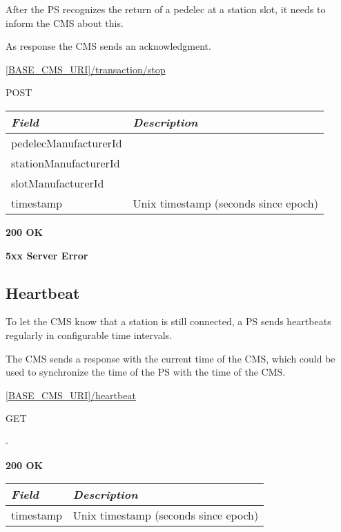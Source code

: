 After the \acs{PS} recognizes the return of a pedelec at a station slot, it needs to inform the \acs{CMS} about this.

As response the \acs{CMS} sends an acknowledgment.

 \url{[BASE_CMS_URI]/transaction/stop}

 POST

\begin{table}[!h]
\vspace{-7mm}
\begin{tabularx}{\linewidth}{ | l | X | }
  \hline
  \textit{Field} & \textit{Description} \\
  \hline \hline
  	pedelecManufacturerId			& \\
  	stationManufacturerId			& \\
  	slotManufacturerId			& \\
  	timestamp					& Unix timestamp (seconds since epoch) \\
  	
    \hline
\end{tabularx}
\end{table}

 \textbf{200 OK}

 \textbf{5xx Server Error}

\subsection{Heartbeat}

To let the \acs{CMS} know that a station is still connected, a \acs{PS} sends heartbeats regularly in configurable time intervals.

The \acs{CMS} sends a response with the current time of the \acs{CMS}, which could be used to synchronize the time of the \acs{PS} with the time of the \acs{CMS}.

 \url{[BASE_CMS_URI]/heartbeat}

 GET

 -

 \textbf{200 OK}

\begin{tabularx}{\linewidth}{ | l | X | }
  \hline
  \textit{Field} & \textit{Description} \\
  \hline \hline
  	timestamp			& Unix timestamp (seconds since epoch) \\	
  \hline
\end{tabularx}


